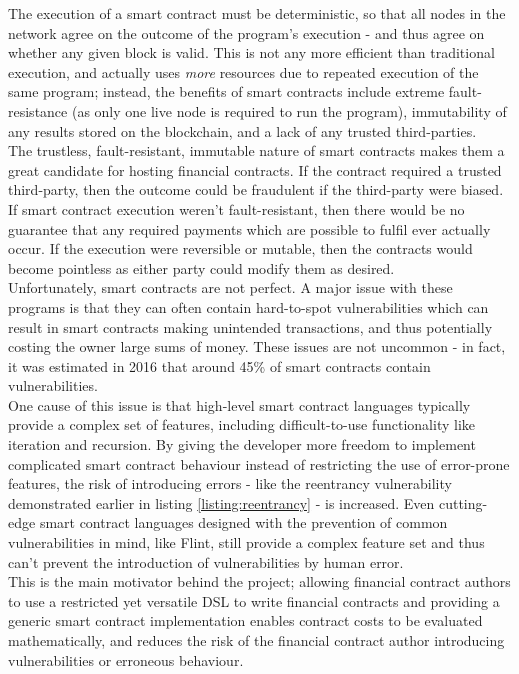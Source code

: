 The execution of a smart contract must be deterministic, so that all nodes in the network agree on the outcome of the program's execution - and thus agree on whether any given block is valid. This is not any more efficient than traditional execution, and actually uses \textit{more} resources due to repeated execution of the same program; instead, the benefits of smart contracts include extreme fault-resistance (as only one live node is required to run the program), immutability of any results stored on the blockchain, and a lack of any trusted third-parties\cite{Eth}. \\

The trustless, fault-resistant, immutable nature of smart contracts makes them a great candidate for hosting financial contracts. If the contract required a trusted third-party, then the outcome could be fraudulent if the third-party were biased. If smart contract execution weren't fault-resistant, then there would be no guarantee that any required payments which are possible to fulfil ever actually occur. If the execution were reversible or mutable, then the contracts would become pointless as either party could modify them as desired. \\

Unfortunately, smart contracts are not perfect. A major issue with these programs is that they can often contain hard-to-spot vulnerabilities which can result in smart contracts making unintended transactions, and thus potentially costing the owner large sums of money. These issues are not uncommon - in fact, it was estimated in 2016 that around 45\% of smart contracts contain vulnerabilities\cite{EthSec}. \\

One cause of this issue is that high-level smart contract languages typically provide a complex set of features, including difficult-to-use functionality like iteration and recursion. By giving the developer more freedom to implement complicated smart contract behaviour instead of restricting the use of error-prone features, the risk of introducing errors - like the reentrancy vulnerability demonstrated earlier in listing \ref{listing:reentrancy} - is increased. Even cutting-edge smart contract languages designed with the prevention of common vulnerabilities in mind, like Flint\cite{flint}, still provide a complex feature set and thus can't prevent the introduction of vulnerabilities by human error. \\

This is the main motivator behind the project; allowing financial contract authors to use a restricted yet versatile DSL to write financial contracts and providing a generic smart contract implementation enables contract costs to be evaluated mathematically, and reduces the risk of the financial contract author introducing vulnerabilities or erroneous behaviour.

